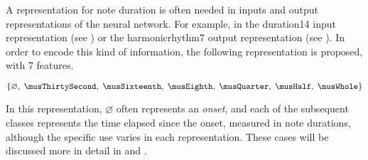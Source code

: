 
A representation for note duration is often needed in inputs
and output representations of the neural network. For
example, in the \gls{duration14} input representation (see
) or the \gls{harmonicrhythm7} output
representation (see ). In
order to encode this kind of information, the following
representation is proposed, with 7 features.

\begin{equation}
    \{\varnothing,\; \musThirtySecond,\; \musSixteenth,\; \musEighth,\; 
    \musQuarter,\; \musHalf,\; \musWhole \}
\end{equation}

In this representation, $\varnothing$ often represents an
\emph{onset}, and each of the subsequent classes represents
the time elapsed since the onset, measured in note
durations, although the specific use varies in each
representation. These cases will be discussed more in detail
in  and
.
